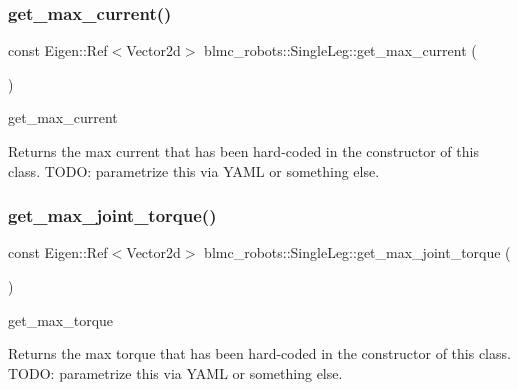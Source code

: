 \subsubsection{\texorpdfstring{get\+\_\+max\+\_\+current()}{get\_max\_current()}}
{\footnotesize\ttfamily const Eigen\+::\+Ref$<$Vector2d$>$ blmc\+\_\+robots\+::\+Single\+Leg\+::get\+\_\+max\+\_\+current (\begin{DoxyParamCaption}{ }\end{DoxyParamCaption})\hspace{0.3cm}{\ttfamily [inline]}}



get\+\_\+max\+\_\+current 

\begin{DoxyReturn}{Returns}
the max current that has been hard-\/coded in the constructor of this class. T\+O\+DO\+: parametrize this via Y\+A\+ML or something else. 
\end{DoxyReturn}
\mbox{\label{classblmc__robots_1_1SingleLeg_ace93cc10397888f07ecf5e14583535f9}} 
\subsubsection{\texorpdfstring{get\+\_\+max\+\_\+joint\+\_\+torque()}{get\_max\_joint\_torque()}}
{\footnotesize\ttfamily const Eigen\+::\+Ref$<$Vector2d$>$ blmc\+\_\+robots\+::\+Single\+Leg\+::get\+\_\+max\+\_\+joint\+\_\+torque (\begin{DoxyParamCaption}{ }\end{DoxyParamCaption})\hspace{0.3cm}{\ttfamily [inline]}}



get\+\_\+max\+\_\+torque 

\begin{DoxyReturn}{Returns}
the max torque that has been hard-\/coded in the constructor of this class. T\+O\+DO\+: parametrize this via Y\+A\+ML or something else. 
\end{DoxyReturn}
\mbox{\label{classblmc__robots_1_1SingleLeg_a6f9fea8b21a7fb58a95882ec3fe78a8d}} 
